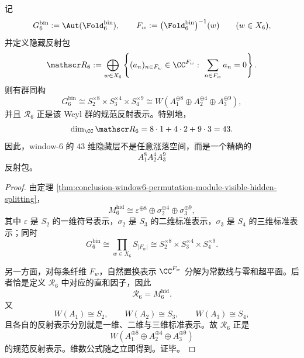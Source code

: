\begin{theorem}\label{thm:conclusion-window6-hidden-a-type-weyl-package}
记
\[
G_6^{\mathrm{bin}}:=\Aut(\Fold_6^{\mathrm{bin}}),
\qquad
F_w:=\bigl(\Fold_6^{\mathrm{bin}}\bigr)^{-1}(w)
\qquad (w\in X_6),
\]
并定义隐藏反射包
\[
\mathscr R_6
:=
\bigoplus_{w\in X_6}
\left\{
(a_n)_{n\in F_w}\in \CC^{F_w}:\ \sum_{n\in F_w}a_n=0
\right\}.
\]
则有群同构
\[
G_6^{\mathrm{bin}}
\cong
S_2^{\times 8}\times S_3^{\times 4}\times S_4^{\times 9}
\cong
W\!\left(A_1^{\oplus 8}\oplus A_2^{\oplus 4}\oplus A_3^{\oplus 9}\right),
\]
并且 \(\mathscr R_6\) 正是该 Weyl 群的规范反射表示。特别地，
\[
\dim_{\CC}\mathscr R_6
=
8\cdot 1+4\cdot 2+9\cdot 3
=
43.
\]
因此，window-\(6\) 的 \(43\) 维隐藏层不是任意涨落空间，而是一个精确的
\[
A_1^8A_2^4A_3^9
\]
反射包。
\end{theorem}
\begin{proof}
由定理 \ref{thm:conclusion-window6-permutation-module-visible-hidden-splitting}，
\[
M_6^{\mathrm{hid}}
\cong
\varepsilon^{\oplus 8}\oplus \sigma_2^{\oplus 4}\oplus \sigma_3^{\oplus 9},
\]
其中 \(\varepsilon\) 是 \(S_2\) 的一维符号表示，\(\sigma_2\) 是 \(S_3\) 的二维标准表示，\(\sigma_3\) 是 \(S_4\) 的三维标准表示；同时
\[
G_6^{\mathrm{bin}}\cong \prod_{w\in X_6}S_{|F_w|}
\cong S_2^{\times 8}\times S_3^{\times 4}\times S_4^{\times 9}.
\]

另一方面，对每条纤维 \(F_w\)，自然置换表示 \(\CC^{F_w}\) 分解为常数线与零和超平面。后者恰是定义 \(\mathscr R_6\) 中对应的直和因子，因此
\[
\mathscr R_6=M_6^{\mathrm{hid}}.
\]
又
\[
W(A_1)\cong S_2,\qquad
W(A_2)\cong S_3,\qquad
W(A_3)\cong S_4,
\]
且各自的反射表示分别就是一维、二维与三维标准表示。故 \(\mathscr R_6\) 正是
\[
W\!\left(A_1^{\oplus 8}\oplus A_2^{\oplus 4}\oplus A_3^{\oplus 9}\right)
\]
的规范反射表示。维数公式随之立即得到。证毕。
\end{proof}

